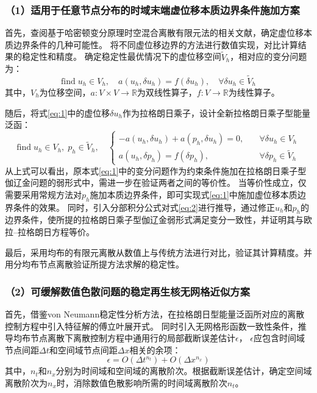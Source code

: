 \subsubsection*{\bfseries （1）适用于任意节点分布的时域末端虚位移本质边界条件施加方案}
首先，查阅基于哈密顿变分原理时空混合离散有限元法的相关文献，确定虚位移本质边界条件的几种可能性。
将不同虚位移边界的方法进行数值实现，对比计算结果的稳定性和精度。
确定稳定性最优情况下的虚位移空间$\tilde V_h$，相对应的变分问题为：
\begin{equation}
    \text{find} \; u_h \in V_h, \quad a(u_h, \delta u_h) = f(\delta u_h), \quad \forall \delta u_h \in \tilde V_h
    \label{eq:1}
\end{equation}
其中，$V_h$为位移空间，$a:V\times V \rightarrow \mathbb R$为双线性算子，$f:V\rightarrow \mathbb R$为线性算子。

随后，将式\eqref{eq:1}中的虚位移$\delta u_h$作为拉格朗日乘子，设计全新拉格朗日乘子型能量泛函：
\begin{equation}
    \text{find} \; u_h \in V_h,\; p_h \in \tilde V_h, \quad
    \left \{
    \begin{split} 
        -a(u_h, \delta u_h) + a(p_h, \delta u_h) = 0,\quad &\forall \delta u_h \in V_h \\
        a(u_h, \delta p_h) = f(\delta p_h),\quad &\forall \delta p_h \in \tilde V_h
    \end{split}
    \right .
    \label{eq:2}
\end{equation}
从上式可以看出，原本式\eqref{eq:1}中的变分问题作为约束条件施加在拉格朗日乘子型伽辽金问题的弱形式中，需进一步在验证两者之间的等价性。
当等价性成立，仅需要采用常规方法对$p_h$施加本质边界条件，即可实现式\eqref{eq:1}中施加虚位移本质边界条件的效果。
同时，引入分部积分公式对式\eqref{eq:2}进行推导，通过修正$u_h$和$p_h$的边界条件，使所提的拉格朗日乘子型伽辽金弱形式满足变分一致性，并证明其与欧拉--拉格朗日方程等价。

最后，采用均布的有限元离散从数值上与传统方法进行对比，验证其计算精度。并用分均布节点离散验证所提方法求解的稳定性。

\subsubsection*{\bfseries （2）可缓解数值色散问题的稳定再生核无网格近似方案}
首先，借鉴von Neumann稳定性分析方法，在拉格朗日型能量泛函所对应的离散控制方程中引入特征解的傅立叶展开式。
同时引入无网格形函数一致性条件，推导均布节点离散下离散控制方程中通用行的局部截断误差估计$\epsilon$，
$\epsilon$应包含时间域节点间距$\Delta t$和空间域节点间距$\Delta x$相关的余项：
\begin{equation}
    \epsilon = O(\Delta t^{n_t}) + O(\Delta x^{n_x})
\end{equation}
其中，$n_t$和$n_x$分别为时间域和空间域的离散阶次。根据截断误差估计，确定空间域离散阶次为$n_x$时，消除数值色散影响所需的时间域离散阶次$n_t$。

